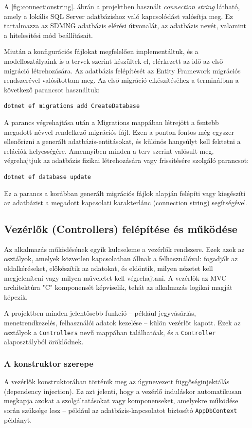 A \ref{fig:connectionstring}. ábrán a projektben használt \textit{connection string} látható, amely a lokális SQL Server adatbázishoz való kapcsolódást valósítja meg. Ez tartalmazza az SDMNG adatbázis elérési útvonalát, az adatbázis nevét, valamint a hitelesítési mód beállításait.
\vspace{\baselineskip}

Miután a konfigurációs fájlokat megfelelően implementáltuk, és a modellosztályaink is a tervek szerint készültek el, elérkezett az idő az első migráció létrehozására. Az adatbázis felépítését az Entity Framework migrációs rendszerével valósítottam meg. Az első migráció elkészítéséhez a terminálban a következő parancsot használtuk: 
\begin{lstlisting}
dotnet ef migrations add CreateDatabase
\end{lstlisting}
A parancs végrehajtása után a Migrations mappában létrejött a fentebb megadott névvel rendelkező migrációs fájl. Ezen a ponton fontos még egyszer ellenőrizni a generált adatbázis-entitásokat, és különös hangsúlyt kell fektetni a relációk helyességére. Amennyiben minden a terv szerint valósult meg, végrehajtjuk az adatbázis fizikai létrehozására vagy frissítésére szolgáló parancsot: 
\begin{lstlisting}
dotnet ef database update
\end{lstlisting}

Ez a parancs a korábban generált migrációs fájlok alapján felépíti vagy kiegészíti az adatbázist a megadott kapcsolati karakterlánc (connection string) segítségével.

\subsection{Vezérlők (Controllers) felépítése és működése}
Az alkalmazás működésének egyik kulcseleme a vezérlők rendszere. Ezek azok az osztályok, amelyek közvetlen kapcsolatban állnak a felhasználóval: fogadják az oldalkéréseket, előkészítik az adatokat, és eldöntik, milyen nézetet kell megjeleníteni vagy milyen műveletet kell végrehajtani. A vezérlők az MVC architektúra "C" komponensét képviselik, tehát az alkalmazás logikai magját képezik.

A projektben minden jelentősebb funkció – például jegyvásárlás, menetrendkezelés, felhasználói adatok kezelése – külön vezérlőt kapott. Ezek az osztályok a \texttt{Controllers} nevű mappában találhatóak, és  a \texttt{Controller} alaposztályból öröklődnek.

\subsubsection{A konstruktor szerepe}
A vezérlők konstruktorában történik meg az úgynevezett függőséginjektálás (dependency injection). Ez azt jelenti, hogy a vezérlő induláskor automatikusan megkapja azokat a szolgáltatásokat vagy komponenseket, amelyekre működése során szüksége lesz – például az adatbázis-kapcsolatot biztosító \texttt{AppDbContext} példányt.

